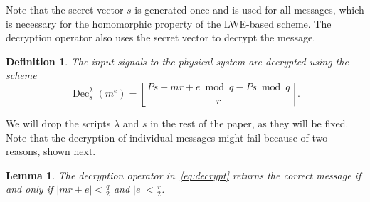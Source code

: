 \documentclass[journal, twoside, web]{ieeecolorpreprint}
\newtheorem{lem}{Lemma}
\newtheorem{defi}{Definition}
\DeclareMathOperator{\dec}{Dec}
\begin{document}
Note that the secret vector $s$ is generated once and is used for all messages, which is necessary for the homomorphic property of the LWE-based scheme. The decryption operator also uses the secret vector to decrypt the message.
\begin{defi}
The input signals to the physical system are decrypted using the scheme
\begin{equation}\label{eq:decrypt}
    \dec^\lambda_s(m^e) =\left \lfloor \frac{Ps+mr+e \bmod q-Ps \bmod q}{r} \right \rceil.
\end{equation}
\end{defi}
We will drop the scripts $\lambda$ and $s$ in the rest of the paper, as they will be fixed. Note that the decryption of individual messages might fail because of two reasons, shown next.
\begin{lem}\label{lem:succ_decrypt}
    The decryption operator in~\eqref{eq:decrypt} returns the correct message if and only if $\vert mr + e \vert < \frac{q}{2}$ and $\vert e \vert <\frac{r}{2}$.
\end{lem}
\end{document}
